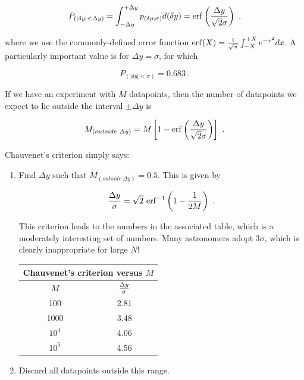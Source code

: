 \documentclass[psfig,preprint]{aastex}
\begin{document}
\begin{equation}
P_{(|\delta y| < \Delta y)} = \int_{-\Delta y}^{+\Delta y} 
  p_{(\delta y; \sigma)} d(\delta y) = 
  {\rm erf}\left({\Delta y \over \sqrt{2} \sigma} \right) \ ,
\end{equation}

\noindent where we use the commonly-defined error function ${\rm
erf}(X) = {1 \over \sqrt{\pi}} \int_{-X}^{+X} e^{-x^2} dx$. A
particularly important value is for $\Delta y = \sigma$, for which 

\begin{equation}
P_{(|\delta y| < \sigma)} = 0.683 \ .
\end{equation}

	If we have an experiment with $M$ datapoints, then the number of
datapoints we expect to lie outside the interval $\pm \Delta y$ is

\begin{equation}
M_{(outside \ \Delta y)} = M \left[ 1 - 
  {\rm erf} \left({\Delta y \over \sqrt{2} \sigma} \right) \right] \ .
\end{equation}

\noindent Chauvenet's criterion simply says: \begin{enumerate}

	\item Find $\Delta y$ such that $M_{(outside \ \Delta y)} =
0.5$. This is given by 

\begin{equation} \label{chauvenetexplicit}
{\Delta y \over \sigma} = \sqrt{2} \ {\rm erf}^{-1}\left( {1 - {1 \over 2M}} \right) \ .
\end{equation}

\noindent This criterion leads to the numbers in the associated table, 
which is a moderately interesting set of numbers. Many
astronomers adopt $3 \sigma$, which is clearly inappropriate for large
$N$! 

\begin{table} [!h]
\begin{center}
\begin{tabular}{cc} 
\\ \hline \hline
\multicolumn{2}{c}{ Chauvenet's criterion versus $M$} 
\\ \hline
$M$ & $\Delta y \over \sigma$ \\ \hline
100 & 2.81 \\
1000 & 3.48 \\
$10^4$ & 4.06 \\
$10^5$ & 4.56 \\ \hline
\hline
\end{tabular}
\end{center}
\end{table}

 
	\item Discard all datapoints outside this range.

\end{enumerate}
\end{document}

